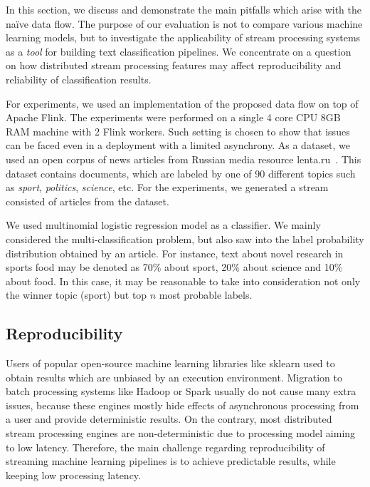 \label {fs-discussion}

In this section, we discuss and demonstrate the main pitfalls which arise with the na\"ive data flow. The purpose of our evaluation is not to compare various machine learning models, but to investigate the applicability of stream processing systems as a {\em tool} for building text classification pipelines. We concentrate on a question on how distributed stream processing features may affect reproducibility and reliability of classification results.

For experiments, we used an implementation of the proposed data flow on top of Apache Flink. The experiments were performed on a single 4 core CPU 8GB RAM machine with 2 Flink workers. Such setting is chosen to show that issues can be faced even in a deployment with a limited asynchrony. As a dataset, we used an open corpus of news articles from Russian media resource lenta.ru~\cite{lentaru}. This dataset contains documents, which are labeled by one of 90 different topics such as {\em sport}, {\em politics}, {\em science}, etc. For the experiments, we generated a stream consisted of articles from the dataset.

We used multinomial logistic regression model as a classifier. We mainly considered the multi-classification problem, but also saw into the label probability distribution obtained by an article. For instance, text about novel research in sports food may be denoted as 70\% about sport, 20\% about science and 10\% about food. In this case, it may be reasonable to take into consideration not only the winner topic (sport) but top $n$ most probable labels.

\subsection{Reproducibility}

Users of popular open-source machine learning libraries like sklearn used to obtain results which are unbiased by an execution environment. Migration to batch processing systems like Hadoop or Spark usually do not cause many extra issues, because these engines mostly hide effects of asynchronous processing from a user and provide deterministic results. On the contrary, most distributed stream processing engines are non-deterministic due to processing model aiming to low latency. Therefore, the main challenge regarding reproducibility of streaming machine learning pipelines is to achieve predictable results, while keeping low processing latency. 

